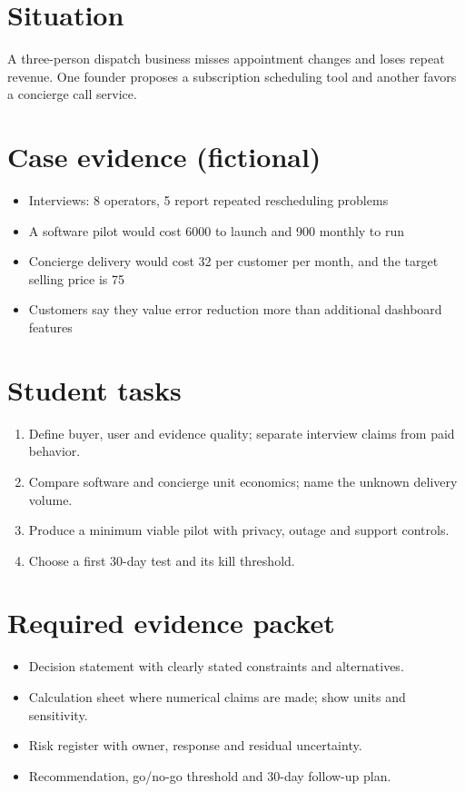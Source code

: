\documentclass[11pt]{article}
\begin{document}
\SuiteOpen
\section{Situation}
A three-person dispatch business misses appointment changes and loses repeat revenue. One founder proposes a subscription scheduling tool and another favors a concierge call service.
\section{Case evidence (fictional)}
\begin{itemize}[leftmargin=*,itemsep=3pt]
\item Interviews: 8 operators, 5 report repeated rescheduling problems
\item A software pilot would cost 6000 to launch and 900 monthly to run
\item Concierge delivery would cost 32 per customer per month, and the target selling price is 75
\item Customers say they value error reduction more than additional dashboard features
\end{itemize}

\section{Student tasks}
\begin{enumerate}[leftmargin=*,itemsep=5pt]
\item Define buyer, user and evidence quality; separate interview claims from paid behavior.
\item Compare software and concierge unit economics; name the unknown delivery volume.
\item Produce a minimum viable pilot with privacy, outage and support controls.
\item Choose a first 30-day test and its kill threshold.
\end{enumerate}

\section{Required evidence packet}
\begin{itemize}[leftmargin=*,itemsep=3pt]
\item Decision statement with clearly stated constraints and alternatives.
\item Calculation sheet where numerical claims are made; show units and sensitivity.
\item Risk register with owner, response and residual uncertainty.
\item Recommendation, go/no-go threshold and 30-day follow-up plan.
\end{itemize}
\end{document}
